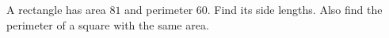 A rectangle has area $81$ and perimeter $60$. Find its side lengths. Also find the perimeter of a square with the same area.
